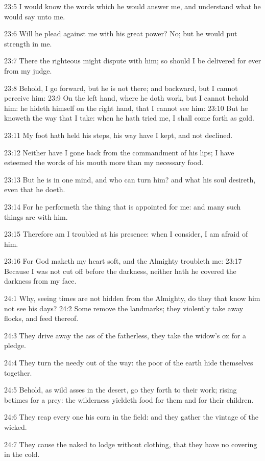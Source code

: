23:5 I would know the words which he would answer me, and understand what he would say unto me.

23:6 Will he plead against me with his great power? No; but he would put strength in me.

23:7 There the righteous might dispute with him; so should I be delivered for ever from my judge.

23:8 Behold, I go forward, but he is not there; and backward, but I cannot perceive him: 23:9 On the left hand, where he doth work, but I cannot behold him: he hideth himself on the right hand, that I cannot see him: 23:10 But he knoweth the way that I take: when he hath tried me, I shall come forth as gold.

23:11 My foot hath held his steps, his way have I kept, and not declined.

23:12 Neither have I gone back from the commandment of his lips; I have esteemed the words of his mouth more than my necessary food.

23:13 But he is in one mind, and who can turn him? and what his soul desireth, even that he doeth.

23:14 For he performeth the thing that is appointed for me: and many such things are with him.

23:15 Therefore am I troubled at his presence: when I consider, I am afraid of him.

23:16 For God maketh my heart soft, and the Almighty troubleth me: 23:17 Because I was not cut off before the darkness, neither hath he covered the darkness from my face.

24:1 Why, seeing times are not hidden from the Almighty, do they that know him not see his days?  24:2 Some remove the landmarks; they violently take away flocks, and feed thereof.

24:3 They drive away the ass of the fatherless, they take the widow's ox for a pledge.

24:4 They turn the needy out of the way: the poor of the earth hide themselves together.

24:5 Behold, as wild asses in the desert, go they forth to their work; rising betimes for a prey: the wilderness yieldeth food for them and for their children.

24:6 They reap every one his corn in the field: and they gather the vintage of the wicked.

24:7 They cause the naked to lodge without clothing, that they have no covering in the cold.

